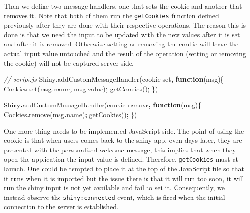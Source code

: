 \documentclass[
]{krantz}
\makeatletter
\newenvironment{Shaded}{\begin{snugshade}}{\end{snugshade}}
\newcommand{\AttributeTok}[1]{\textcolor[rgb]{0.61,0.61,0.61}{#1}}
\newcommand{\BuiltInTok}[1]{#1}
\newcommand{\CommentTok}[1]{\textcolor[rgb]{0.37,0.37,0.37}{\textit{#1}}}
\newcommand{\FunctionTok}[1]{\textcolor[rgb]{0,0,0}{#1}}
\newcommand{\KeywordTok}[1]{\textcolor[rgb]{0.27,0.27,0.27}{\textbf{#1}}}
\newcommand{\NormalTok}[1]{#1}
\newcommand{\OperatorTok}[1]{\textcolor[rgb]{0.43,0.43,0.43}{\textbf{#1}}}
\newcommand{\StringTok}[1]{\textcolor[rgb]{0.5,0.5,0.5}{#1}}
\newenvironment{kframe}{%
\medskip{}
\setlength{\fboxsep}{.8em}
 \def\at@end@of@kframe{}%
 \ifinner\ifhmode%
  \def\at@end@of@kframe{\end{minipage}}%
  \begin{minipage}{\columnwidth}%
 \fi\fi%
 \def\FrameCommand##1{\hskip\@totalleftmargin \hskip-\fboxsep
 \colorbox{shadecolor}{##1}\hskip-\fboxsep
     \hskip-\linewidth \hskip-\@totalleftmargin \hskip\columnwidth}%
 \MakeFramed {\advance\hsize-\width
   \@totalleftmargin\z@ \linewidth\hsize
   \@setminipage}}%
 {\par\unskip\endMakeFramed%
 \at@end@of@kframe}
\renewenvironment{Shaded}{\begin{kframe}}{\end{kframe}}
\makeatother
\begin{document}
Then we define two message handlers, one that sets the cookie and another that removes it. Note that both of them run the \texttt{getCookies} function defined previously after they are done with their respective operations. The reason this is done is that we need the input to be updated with the new values after it is set and after it is removed. Otherwise setting or removing the cookie will leave the actual input value untouched and the result of the operation (setting or removing the cookie) will not be captured server-side.

\begin{Shaded}
\begin{Highlighting}[]
\CommentTok{// script.js}
\NormalTok{Shiny}\OperatorTok{.}\FunctionTok{addCustomMessageHandler}\NormalTok{(}\StringTok{\textquotesingle{}cookie{-}set\textquotesingle{}}\OperatorTok{,} \KeywordTok{function}\NormalTok{(msg)\{}
\NormalTok{  Cookies}\OperatorTok{.}\FunctionTok{set}\NormalTok{(msg}\OperatorTok{.}\AttributeTok{name}\OperatorTok{,}\NormalTok{ msg}\OperatorTok{.}\AttributeTok{value}\NormalTok{)}\OperatorTok{;}
\NormalTok{  getCookies()}\OperatorTok{;}
\NormalTok{\})}

\NormalTok{Shiny}\OperatorTok{.}\FunctionTok{addCustomMessageHandler}\NormalTok{(}\StringTok{\textquotesingle{}cookie{-}remove\textquotesingle{}}\OperatorTok{,} \KeywordTok{function}\NormalTok{(msg)\{}
\NormalTok{  Cookies}\OperatorTok{.}\FunctionTok{remove}\NormalTok{(msg}\OperatorTok{.}\AttributeTok{name}\NormalTok{)}\OperatorTok{;}
\NormalTok{  getCookies()}\OperatorTok{;}
\NormalTok{\})}
\end{Highlighting}
\end{Shaded}

One more thing needs to be implemented JavaScript-side. The point of using the cookie is that when users comes back to the shiny app, even days later, they are presented with the personalised welcome message, this implies that when they open the application the input value is defined. Therefore, \texttt{getCookies} must at launch. One could be tempted to place it at the top of the JavaScript file so that it runs when it is imported but the issue there is that it will run too soon, it will run the shiny input is not yet available and fail to set it. Consequently, we instead observe the \texttt{shiny:connected} event, which is fired when the initial connection to the server is established.

\begin{Shaded}
\end{Shaded}
\end{document}
